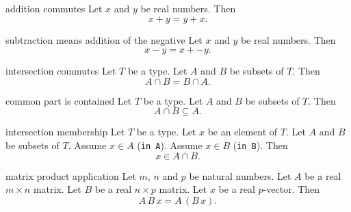 \begin{cleanresult}{addition commutes}
Let $x$ and $y$ be real numbers.
Then \[x+y=y+x.\]
\end{cleanresult}

\begin{cleanresult}{subtraction means addition of the negative}
Let $x$ and $y$ be real numbers.
Then \[x-y=x+-y.\]
\par{}
\end{cleanresult}

\begin{cleanresult}{intersection commutes}
Let $T$ be a type.
Let $A$ and $B$ be subsets of $T$.
Then \[A\cap B=B\cap A.\]
\par{}
\end{cleanresult}

\begin{cleanresult}{common part is contained}
Let $T$ be a type.
Let $A$ and $B$ be subsets of $T$.
Then \[A\cap B\subseteq A.\]
\par{}
\end{cleanresult}

\begin{cleanresult}{intersection membership}
Let $T$ be a type.
Let $x$ be an element of $T$.
Let $A$ and $B$ be subsets of $T$.
Assume $x\in A$ (\texttt{in A}).
Assume $x\in B$ (\texttt{in B}).
Then \[x\in A\cap B.\]
\par{}
\end{cleanresult}

\begin{cleanresult}{matrix product application}
Let $m$, $n$ and $p$ be natural numbers.
Let $A$ be a real $m\times n$ matrix.
Let $B$ be a real $n\times p$ matrix.
Let $x$ be a real $p$-vector.
Then \[A\,B\,x=A\,\left(B\,x\right).\]
\par{}
\end{cleanresult}

